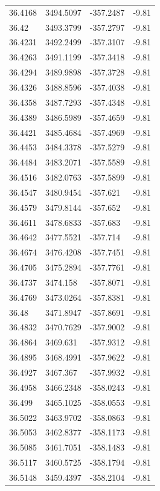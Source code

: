 \begin{table}[H]
\begin{tabular}{llll}
36.4168 & 3494.5097 & -357.2487 & -9.81 \\
36.42 & 3493.3799 & -357.2797 & -9.81 \\
36.4231 & 3492.2499 & -357.3107 & -9.81 \\
36.4263 & 3491.1199 & -357.3418 & -9.81 \\
36.4294 & 3489.9898 & -357.3728 & -9.81 \\
36.4326 & 3488.8596 & -357.4038 & -9.81 \\
36.4358 & 3487.7293 & -357.4348 & -9.81 \\
36.4389 & 3486.5989 & -357.4659 & -9.81 \\
36.4421 & 3485.4684 & -357.4969 & -9.81 \\
36.4453 & 3484.3378 & -357.5279 & -9.81 \\
36.4484 & 3483.2071 & -357.5589 & -9.81 \\
36.4516 & 3482.0763 & -357.5899 & -9.81 \\
36.4547 & 3480.9454 & -357.621 & -9.81 \\
36.4579 & 3479.8144 & -357.652 & -9.81 \\
36.4611 & 3478.6833 & -357.683 & -9.81 \\
36.4642 & 3477.5521 & -357.714 & -9.81 \\
36.4674 & 3476.4208 & -357.7451 & -9.81 \\
36.4705 & 3475.2894 & -357.7761 & -9.81 \\
36.4737 & 3474.158 & -357.8071 & -9.81 \\
36.4769 & 3473.0264 & -357.8381 & -9.81 \\
36.48 & 3471.8947 & -357.8691 & -9.81 \\
36.4832 & 3470.7629 & -357.9002 & -9.81 \\
36.4864 & 3469.631 & -357.9312 & -9.81 \\
36.4895 & 3468.4991 & -357.9622 & -9.81 \\
36.4927 & 3467.367 & -357.9932 & -9.81 \\
36.4958 & 3466.2348 & -358.0243 & -9.81 \\
36.499 & 3465.1025 & -358.0553 & -9.81 \\
36.5022 & 3463.9702 & -358.0863 & -9.81 \\
36.5053 & 3462.8377 & -358.1173 & -9.81 \\
36.5085 & 3461.7051 & -358.1483 & -9.81 \\
36.5117 & 3460.5725 & -358.1794 & -9.81 \\
36.5148 & 3459.4397 & -358.2104 & -9.81 \\

\end{tabular}
\end{table}
